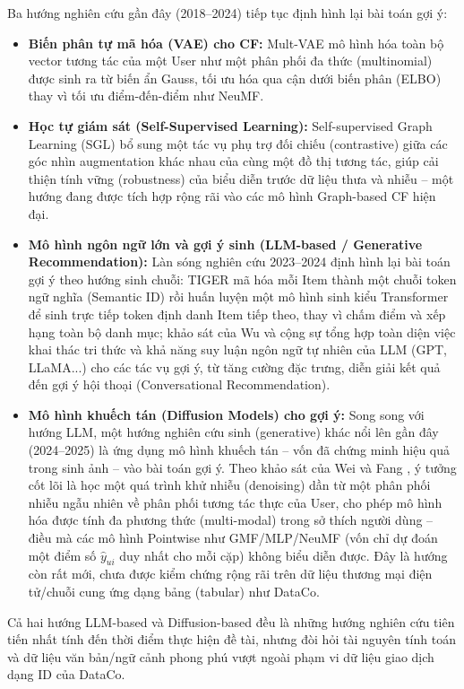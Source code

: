 Ba hướng nghiên cứu gần đây (2018--2024) tiếp tục định hình lại bài toán gợi ý:
\begin{itemize}
    \item \textbf{Biến phân tự mã hóa (VAE) cho CF:} Mult-VAE \parencite{liang2018multvae} mô hình hóa toàn bộ vector tương tác của một User như một phân phối đa thức (multinomial) được sinh ra từ biến ẩn Gauss, tối ưu hóa qua cận dưới biến phân (ELBO) thay vì tối ưu điểm-đến-điểm như NeuMF.
    \item \textbf{Học tự giám sát (Self-Supervised Learning):} Self-supervised Graph Learning (SGL) \parencite{wu2021sgl} bổ sung một tác vụ phụ trợ đối chiếu (contrastive) giữa các góc nhìn augmentation khác nhau của cùng một đồ thị tương tác, giúp cải thiện tính vững (robustness) của biểu diễn trước dữ liệu thưa và nhiễu -- một hướng đang được tích hợp rộng rãi vào các mô hình Graph-based CF hiện đại.
    \item \textbf{Mô hình ngôn ngữ lớn và gợi ý sinh (LLM-based / Generative Recommendation):} Làn sóng nghiên cứu 2023--2024 định hình lại bài toán gợi ý theo hướng sinh chuỗi: TIGER \parencite{rajput2023tiger} mã hóa mỗi Item thành một chuỗi token ngữ nghĩa (Semantic ID) rồi huấn luyện một mô hình sinh kiểu Transformer để sinh trực tiếp token định danh Item tiếp theo, thay vì chấm điểm và xếp hạng toàn bộ danh mục; khảo sát của Wu và cộng sự \parencite{wu2023survey_llm4rec} tổng hợp toàn diện việc khai thác tri thức và khả năng suy luận ngôn ngữ tự nhiên của LLM (GPT, LLaMA...) cho các tác vụ gợi ý, từ tăng cường đặc trưng, diễn giải kết quả đến gợi ý hội thoại (Conversational Recommendation).
    \item \textbf{Mô hình khuếch tán (Diffusion Models) cho gợi ý:} Song song với hướng LLM, một hướng nghiên cứu sinh (generative) khác nổi lên gần đây (2024--2025) là ứng dụng mô hình khuếch tán -- vốn đã chứng minh hiệu quả trong sinh ảnh -- vào bài toán gợi ý. Theo khảo sát của Wei và Fang \parencite{wei2025diffusion}, ý tưởng cốt lõi là học một quá trình khử nhiễu (denoising) dần từ một phân phối nhiễu ngẫu nhiên về phân phối tương tác thực của User, cho phép mô hình hóa được tính đa phương thức (multi-modal) trong sở thích người dùng -- điều mà các mô hình Pointwise như GMF/MLP/NeuMF (vốn chỉ dự đoán một điểm số $\hat{y}_{ui}$ duy nhất cho mỗi cặp) không biểu diễn được. Đây là hướng còn rất mới, chưa được kiểm chứng rộng rãi trên dữ liệu thương mại điện tử/chuỗi cung ứng dạng bảng (tabular) như DataCo.
\end{itemize}
Cả hai hướng LLM-based và Diffusion-based đều là những hướng nghiên cứu tiên tiến nhất tính đến thời điểm thực hiện đề tài, nhưng đòi hỏi tài nguyên tính toán và dữ liệu văn bản/ngữ cảnh phong phú vượt ngoài phạm vi dữ liệu giao dịch dạng ID của DataCo.


